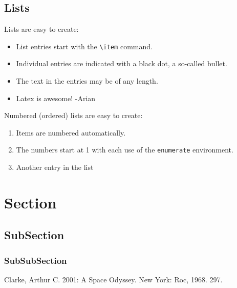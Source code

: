 \documentclass[12pt, dvipsnames, a4paper]{article}
\begin{document}
\subsection{Lists}
Lists are easy to create:
\begin{itemize}
	\item List entries start with the \verb|\item| command.
	\item Individual entries are indicated with a black dot, a so-called bullet.
	\item The text in the entries may be of any length.
	\item Latex is awesome! -Arian
\end{itemize}
Numbered (ordered) lists are easy to create:
\begin{enumerate}
	\item Items are numbered automatically.
	\item The numbers start at 1 with each use of the \texttt{enumerate} environment.
	\item Another entry in the list
\end{enumerate}

\section{Section}
\lipsum[1]
\subsection{SubSection}
\lipsum[1]
\subsubsection{SubSubSection}
\lipsum[1]

\begin{thebibliography}{00}
	 Clarke, Arthur C. 2001: A Space Odyssey. New York: Roc, 1968. 297.
\end{thebibliography}
\end{document}
